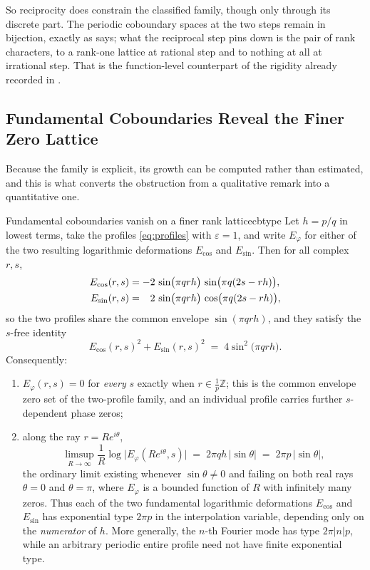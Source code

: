 \documentclass[11pt,letterpaper]{article}
\newcommand{\Zint}{\mathbb{Z}}
\begin{document}
So reciprocity does constrain the classified family, though only through its
discrete part. The periodic coboundary spaces at the two steps remain in
bijection, exactly as  says; what the reciprocal step
pins down is the pair of rank characters, to a rank-one lattice at rational
step and to nothing at all at irrational step. That is the function-level
counterpart of the rigidity already recorded in .

\subsection{Fundamental Coboundaries Reveal the Finer Zero Lattice}

Because the family is explicit, its growth can be computed rather than
estimated, and this is what converts the obstruction from a qualitative remark
into a quantitative one.

\begin{proposition}{Fundamental coboundaries vanish on a finer rank lattice}{cbtype}
Let $h=p/q$ in lowest terms, take the profiles \eqref{eq:profiles} with
$\varepsilon=1$, and write $E_\varphi$ for either of the two resulting
logarithmic deformations $E_{\cos}$ and $E_{\sin}$. Then for all complex $r,s$,
\begin{align}
  E_{\cos}(r,s)&=-2\,\sin\bigl(\pi q rh\bigr)\,\sin\bigl(\pi q(2s-rh)\bigr),\notag\\
  E_{\sin}(r,s)&=\phantom{-}2\,\sin\bigl(\pi q rh\bigr)\,\cos\bigl(\pi q(2s-rh)\bigr),
  \label{eq:cbfactor}
\end{align}
so the two profiles share the common envelope $\sin(\pi q rh)$, and they
satisfy the $s$-free identity
\begin{equation}
  E_{\cos}(r,s)^2+E_{\sin}(r,s)^2\;=\;4\sin^2\bigl(\pi q rh\bigr).
  \label{eq:cbinvariant}
\end{equation}
Consequently:
\begin{enumerate}
\item[(i)] $E_\varphi(r,s)=0$ for \emph{every} $s$ exactly when $r\in\tfrac1p\Zint$;
  this is the common envelope zero set of the two-profile family, and an
  individual profile carries further $s$-dependent phase zeros;
\item[(ii)] along the ray $r=Re^{i\theta}$,
\begin{equation}
  \limsup_{R\to\infty}\frac{1}{R}\log\bigl|E_\varphi(Re^{i\theta},s)\bigr|
  \;=\;2\pi qh\,\lvert\sin\theta\rvert\;=\;2\pi p\,\lvert\sin\theta\rvert,
  \label{eq:cbtype}
\end{equation}
the ordinary limit existing whenever $\sin\theta\neq0$ and failing on both real
rays $\theta=0$ and $\theta=\pi$, where $E_\varphi$ is a bounded function of $R$
with infinitely many zeros. Thus each of the two fundamental logarithmic
deformations $E_{\cos}$ and $E_{\sin}$ has exponential type $2\pi p$ in the
interpolation variable, depending only on the \emph{numerator} of $h$. More
generally, the $n$-th Fourier mode has type $2\pi|n|p$, while an arbitrary
periodic entire profile need not have finite exponential type.
\end{enumerate}
\end{proposition}
\end{document}
